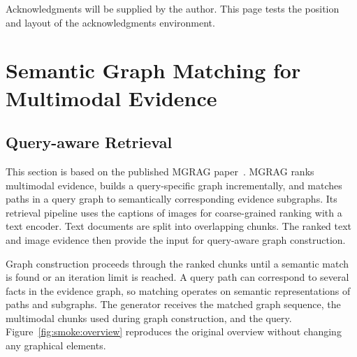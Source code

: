\documentclass[customlatinfont=gyre,displaycommittee=false,blankpage=false]{template/hkust-thesis-v0.11.6/hkustthesis}
\begin{document}
\frontmatter
\maketitle
\begin{abstract}
This document tests the typesetting of an English PhD thesis on structural augmentation for language models. It contains one published MGRAG overview figure, the published dataset statistics, a mathematical expression for selective KV recomputation, and a concise algorithmic description of its retrieval workflow. The research content is included to test figure clarity, table width, mathematical fonts, algorithm formatting, bibliography integration, and page numbering. Author-specific signature information remains explicitly marked for confirmation. This is a template evaluation document rather than a submission copy or a research chapter.
\end{abstract}
\authorization
\signaturepage
\begin{acknowledgements}
Acknowledgments will be supplied by the author. This page tests the position and layout of the acknowledgments environment.
\end{acknowledgements}
\tableofcontents
\listoffigures
\listoftables
\mainmatter
\chapter{Semantic Graph Matching for Multimodal Evidence}
\label{ch:smoke}
\section{Query-aware Retrieval}
This section is based on the published MGRAG paper~\cite{smoke:mgrag}. MGRAG ranks multimodal evidence, builds a query-specific graph incrementally, and matches paths in a query graph to semantically corresponding evidence subgraphs. Its retrieval pipeline uses the captions of images for coarse-grained ranking with a text encoder. Text documents are split into overlapping chunks. The ranked text and image evidence then provide the input for query-aware graph construction.

Graph construction proceeds through the ranked chunks until a semantic match is found or an iteration limit is reached. A query path can correspond to several facts in the evidence graph, so matching operates on semantic representations of paths and subgraphs. The generator receives the matched graph sequence, the multimodal chunks used during graph construction, and the query. Figure~\ref{fig:smoke:overview} reproduces the original overview without changing any graphical elements.
\end{document}

